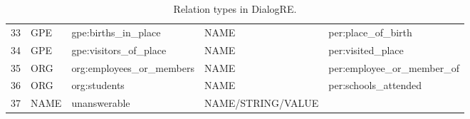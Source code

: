 \documentclass[11pt,a4paper]{article}
\begin{document}
\begin{table*}[h]
{\begin{tabular}{lllll}
33          & GPE              & gpe:births\_in\_place       & NAME              & per:place\_of\_birth        \\
34          & GPE              & gpe:visitors\_of\_place     & NAME              & per:visited\_place         \\
35          & ORG              & org:employees\_or\_members  & NAME              & per:employee\_or\_member\_of \\
36          & ORG              & org:students              & NAME              & per:schools\_attended      \\
37          & NAME             & unanswerable              & NAME/STRING/VALUE &              \\            
\bottomrule
\end{tabular}}
\caption{Relation types in DialogRE.}
\label{tab:dialogre_types}
\end{table*}
\end{document}
